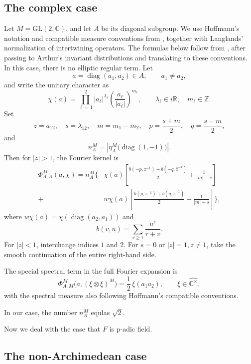 \documentclass[11pt]{amsart}
\theoremstyle{definition}
\numberwithin{equation}{section}
\begin{document}
	\subsection{The complex case}
	Let $M=\mathrm{GL}(2,\mathbb C)$, and let $A$ be its diagonal subgroup. We use Hoffmann's notation and compatible measure conventions from \cite{Hof08}, together with Langlands' normalization of intertwining operators. The formulas below follow from \cite{Hof97}, after passing to Arthur's invariant distributions and translating to these conventions. In this case, there is no elliptic regular term. Let \[a=\operatorname{diag}(a_1,a_2)\in A,\qquad a_1\neq a_2,\]
	and write the unitary character as
	\[
	\chi(a)=\prod_{\ell=1}^2
	|a_\ell|^{\lambda_\ell}
	\left(\frac{a_\ell}{|a_\ell|}\right)^{m_\ell},
	\qquad \lambda_\ell\in i\mathbb{R},\quad m_\ell\in\mathbb{Z}.
	\]
	Set
	\[
	z=a_{12},\quad s=\lambda_{12},\quad m=m_1-m_2,\quad
	p=\frac{s+m}{2},\quad q=\frac{s-m}{2},
	\]
	and
	\[
	n_A^M=\left|\eta_A^M\bigl(\operatorname{diag}(1,-1)\bigr)\right|.
	\]
	Then for \(|z|>1\), the Fourier kernel is
	\[
		\begin{aligned}
			\Phi^M_{A,A}(a,\chi)
			=n_A^M\Bigg\{&
			\chi(a)\left[
			\frac{b(-p,z^{-1})+b(-q,\bar z^{-1})}{2}
			+\frac{1}{|m|-s}\right]\\
			+{}&w\chi(a)\left[
			\frac{b(p,z^{-1})+b(q,\bar z^{-1})}{2}
			+\frac{1}{|m|+s}\right]\Bigg\},
	\end{aligned}
	\]
	where \(w\chi(a)=\chi(\operatorname{diag}(a_2,a_1))\) and
	\[
	b(v,u)=\sum_{r\ge1}\frac{u^r}{r+v}.
	\]
	For \(|z|<1\), interchange indices \(1\) and \(2\). For \(s=0\) or \(|z|=1, z\ne1\), take the smooth continuation of the entire right-hand side.
	
	The special spectral term in the full Fourier expansion is
	\[
	\Phi^M_{A,M}\bigl(a,(\xi\otimes\xi)^M\bigr)
	=\frac{1}{2}\,\xi(a_1a_2),
	\qquad \xi\in\widehat{\mathbb{C}^\times},
	\]
	with the spectral measure also following Hoffmann's compatible conventions.
	
	In our case, the number \(n_A^M\) equlas \(\sqrt{2}\).
	
	Now we deal with the case that \(F\) is p-adic field.
	\subsection{The non-Archimedean case}
\end{document}
